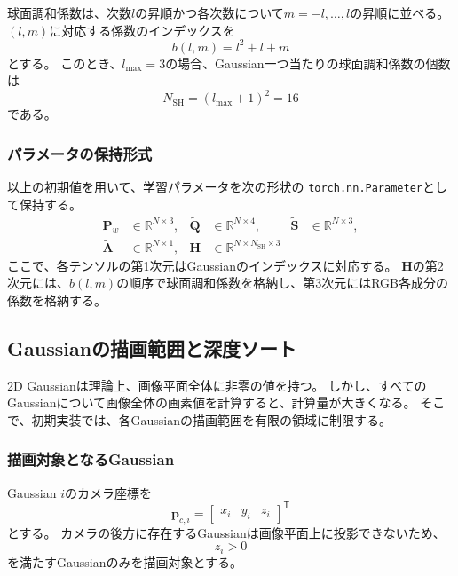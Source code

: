 \documentclass[dvipdfmx]{jlreq}
\begin{document}
球面調和係数は、次数$l$の昇順かつ各次数について$m=-l,\ldots,l$の昇順に並べる。
$(l,m)$に対応する係数のインデックスを
\begin{equation}
    b(l,m) = l^2+l+m
\end{equation}
とする。
このとき、$l_{\max}=3$の場合、Gaussian一つ当たりの球面調和係数の個数は
\begin{equation}
    N_{\mathrm{SH}} = \left(l_{\max}+1\right)^2 = 16
\end{equation}
である。

\subsubsection*{パラメータの保持形式}
以上の初期値を用いて、学習パラメータを次の形状の
\texttt{torch.nn.Parameter}として保持する。
\begin{equation*}
    \begin{aligned}
        \bm{P}_w
        &\in\mathbb{R}^{N\times3},
        &
        \widetilde{\bm{Q}}
        &\in\mathbb{R}^{N\times4},
        &
        \widetilde{\bm{S}}
        &\in\mathbb{R}^{N\times3},\\
        \widetilde{\bm{A}}
        &\in\mathbb{R}^{N\times1},
        &
        \bm{H}
        &\in\mathbb{R}^{N\times N_{\mathrm{SH}}\times3}
    \end{aligned}
\end{equation*}
ここで、各テンソルの第1次元はGaussianのインデックスに対応する。
$\bm{H}$の第2次元には、$b(l,m)$の順序で球面調和係数を格納し、第3次元にはRGB各成分の係数を格納する。

\subsection{Gaussianの描画範囲と深度ソート}
\label{sec:rendering_range_and_sorting}

2D Gaussianは理論上、画像平面全体に非零の値を持つ。
しかし、すべてのGaussianについて画像全体の画素値を計算すると、計算量が大きくなる。
そこで、初期実装では、各Gaussianの描画範囲を有限の領域に制限する。

\subsubsection*{描画対象となるGaussian}
Gaussian $i$のカメラ座標を
\begin{equation}
    \bm{p}_{c,i} = \begin{bmatrix} x_i & y_i & z_i \end{bmatrix}^{\mathsf T}
\end{equation}
とする。
カメラの後方に存在するGaussianは画像平面上に投影できないため、
\begin{equation}
    z_i>0
    \label{eq:visible_depth_condition}
\end{equation}
を満たすGaussianのみを描画対象とする。
\end{document}
